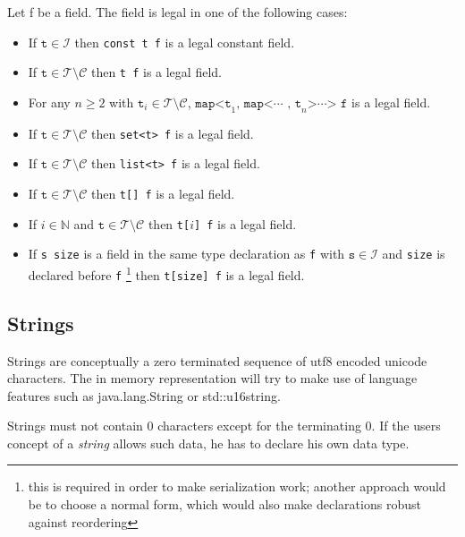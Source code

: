\documentclass[a4paper,10pt]{article}
\begin{document}
Let f be a field. The field is legal in one of the following cases:
\begin{itemize}
 \item If $\texttt{t} \in \mathcal{I}$ then \verb/const t f/ is a legal constant field.
 
 \item If $\texttt{t} \in \mathcal{T}\setminus\mathcal{C}$ then \verb/t f/ is a legal field.
 
 \item For any $n \geq 2$ with $\texttt{t}_i \in \mathcal{T}\setminus\mathcal{C}$, $\texttt{map<t}_1\texttt{, map<}\cdots\texttt{ , t}_n\texttt{>}\cdots\texttt{> f}$ is a legal field.
 
 \item If $\texttt{t} \in \mathcal{T}\setminus\mathcal{C}$ then \verb/set<t> f/ is a legal field.
 
 \item If $\texttt{t} \in \mathcal{T}\setminus\mathcal{C}$ then \verb/list<t> f/ is a legal field.
 
 \item If $\texttt{t} \in \mathcal{T}\setminus\mathcal{C}$ then \verb/t[] f/ is a legal field.
 
 \item If $i \in \mathbb{N}$ and $\texttt{t} \in \mathcal{T}\setminus\mathcal{C}$ then \verb/t[/$i$\verb/] f/ is a legal field.
 
 \item If \verb/s size/ is a field in the same type declaration as \texttt{f} with $\texttt{s} \in \mathcal{I}$ and \texttt{size} is declared before \texttt{f}
 \footnote{this is required in order to make serialization work; another approach would be to choose a normal form, which would also make declarations robust against reordering} then \verb/t[size] f/ is a legal field.
 
\end{itemize}

\subsection*{Strings}

Strings are conceptually a zero terminated sequence of utf8 encoded unicode characters. The in memory representation will try to make use of language features such as java.lang.String or std::u16string.

Strings must not contain 0 characters except for the terminating 0. If the users concept of a \textit{string} allows such data, he has to declare his own data type.
\end{document}
